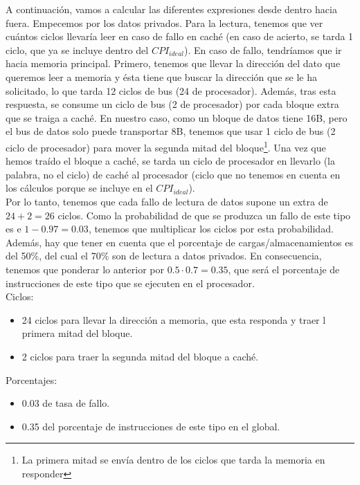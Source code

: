 \documentclass[12pt,a4paper]{article}
\begin{document}
A continuación, vamos a calcular las diferentes expresiones desde dentro hacia fuera. Empecemos por los datos privados. Para la lectura, tenemos que ver cuántos ciclos llevaría leer en caso de fallo en caché (en caso de acierto, se tarda 1 ciclo, que ya se incluye dentro del $CPI_{ideal}$). En caso de fallo, tendríamos que ir hacia memoria principal. Primero, tenemos que llevar la dirección del dato que queremos leer a memoria y ésta tiene que buscar la dirección que se le ha solicitado, lo que tarda 12 ciclos de bus (24 de procesador). Además, tras esta respuesta, se consume un ciclo de bus (2 de procesador) por cada bloque extra que se traiga a caché. En nuestro caso, como un bloque de datos tiene 16B, pero el bus de datos solo puede transportar 8B, tenemos que usar 1 ciclo de bus (2 ciclo de procesador) para mover la segunda mitad del bloque\footnote{La primera mitad se envía dentro de los ciclos que tarda la memoria en responder}. Una vez que hemos traído el bloque a caché, se tarda un ciclo de procesador en llevarlo (la palabra, no el ciclo) de caché al procesador (ciclo que no tenemos en cuenta en los cálculos porque se incluye en el $CPI_{ideal}$). \\

Por lo tanto, tenemos que cada fallo de lectura de datos supone un extra de $24+2=26$ ciclos. Como la probabilidad de que se produzca un fallo de este tipo es e $1-0.97=0.03$, tenemos que multiplicar los ciclos por esta probabilidad. Además, hay que tener en cuenta que el porcentaje de cargas/almacenamientos es del 50\%, del cual el 70\% son de lectura a datos privados. En consecuencia, tenemos que ponderar lo anterior por $0.5\cdot 0.7=0.35$, que será el porcentaje de instrucciones de este tipo que se ejecuten en el procesador.\\

Ciclos:
\begin{itemize}
\item 24 ciclos para llevar la dirección a memoria, que esta responda y traer l primera mitad del bloque.
\item 2 ciclos para traer la segunda mitad del bloque a caché.
\end{itemize}

Porcentajes:
\begin{itemize}
\item 0.03 de tasa de fallo.
\item 0.35 del porcentaje de instrucciones de este tipo en el global.
\end{itemize}
\end{document}
